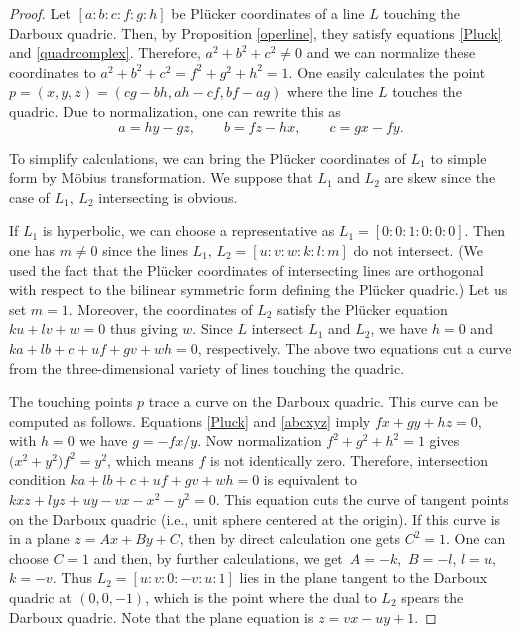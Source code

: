 \documentclass[pdftex]{sigma}
\numberwithin{equation}{section}
\begin{document}
\begin{proof}
Let $[a:b:c:f:g:h]$ be Pl\"ucker coordinates of a line $L$ touching the Darboux quadric. Then, by Proposition \ref{operline}, they satisfy equations \eqref{Pluck} and \eqref{quadrcomplex}. Therefore, $a^2+b^2+c^2\ne 0$ and we can normalize these coordinates to $a^2+b^2+c^2=f^2+g^2+h^2=1$. One easily calculates the point $p=(x,y,z)=(cg-bh,ah-cf,bf-ag)$ where the line $L$ touches the quadric. Due to normalization, one can rewrite this as
\begin{equation}\label{abcxyz}
a =hy -gz, \qquad b = f z - h x, \qquad c =gx -fy.
\end{equation}

 To simplify calculations, we can bring the Pl\"ucker coordinates of $L_1$ to simple form by M\"obius transformation. We suppose that $L_1$ and $L_2$ are skew since the case of $L_1$, $L_2$ intersecting is obvious.

If $L_1$ is hyperbolic, we can choose a representative as $L_1=[0:0:1:0:0:0]$. Then one has $m\ne 0$ since the lines $L_1$, $L_2=[u:v:w:k:l:m]$ do not intersect. (We used the fact that the Pl\"ucker coordinates of intersecting lines are orthogonal with respect to the bilinear symmetric form defining the Pl\"ucker quadric.) Let us set $m=1$. Moreover, the coordinates of $L_2$ satisfy the Pl\"ucker equation $ku+lv+w=0$ thus giving $w$. Since $L$ intersect $L_1$ and $L_2$, we have $h=0$ and $ka+lb+c+uf+gv+wh=0$, respectively. The above two equations cut a curve from the three-dimensional variety of lines touching the quadric.


The touching points $p$ trace a curve on the Darboux quadric.
This curve can be computed as follows. Equations \eqref{Pluck} and \eqref{abcxyz} imply $fx + gy + hz=0$, with $h=0$ we have ${g = -fx/y}$. Now normalization $f^2+g^2+h^2=1$ gives $\bigl(x^2 + y^2\bigr)f^2 = y^2$, which means $f$ is not identically zero. Therefore, intersection condition $ka+lb+c+uf+gv+wh=0$ is equivalent to $kxz + lyz + uy - vx - x^2 - y^2=0$. This equation cuts the curve of tangent points on the Darboux quadric (i.e., unit sphere centered at the origin).
If this curve is in a plane $z = Ax + By + C$, then by direct calculation one gets $C^2=1$. One can choose $C=1$ and then, by further calculations, we get~${A=-k}$,~${B=-l}$, $l=u$, $k=-v$. Thus $L_2=[u:v:0:-v:u:1]$ lies in the plane tangent to the Darboux quadric at $(0,0,-1)$, which is the point where the dual to $L_2$ spears the Darboux quadric. Note that the plane equation is $z = vx -uy + 1$.


\end{proof}
\end{document}
